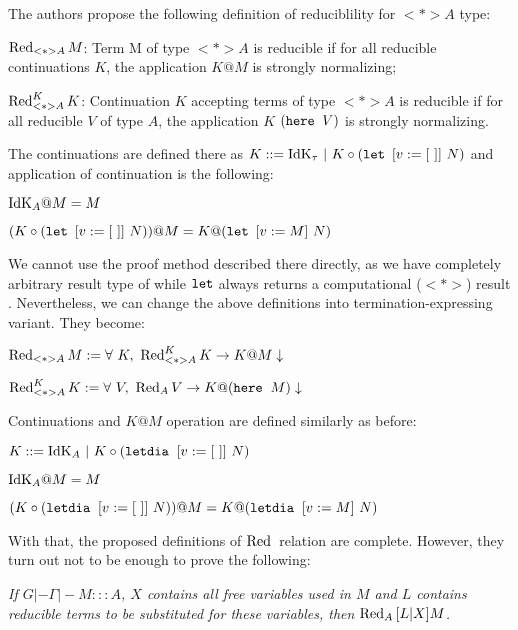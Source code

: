 The authors propose the following definition of reduciblility for $<*>A$ type:
\begin{description}
\item $\Red{M}{<*>A}$: Term M of type $<*>A$ is reducible if for all reducible continuations $K$, the application $K @ M$ is strongly normalizing;
\item $\RedK{K}{<*>A}$: Continuation $K$ accepting terms of type $<*>A$ is reducible if for all reducible $V$ of type $A$, the application $K $ $(\here{V})$ is strongly normalizing.
\end{description}

The continuations are defined there as $ K ::= \IdK{\tau} ~|~ K \circ (\letT{v}{[~]}{N})$ and application of continuation is the following:
\begin{description}
\item $\IdK{A} @ M = M$
\item $ (K \circ (\letT{v}{[~]}{N})) @ M = K @ (\letT{v}{M}{N})$
\end{description}

We cannot use the proof method described there directly, as we have completely arbitrary result type of  while $\letTe{}$ always returns a computational ($<*>$) result . Nevertheless, we can change the above definitions into termination-expressing variant. They become:
\begin{description}
\item $\Red{M}{<*>A} := \forall\ K,\ \RedK{K}{<*>A}-> \termin{K@M}$
\item $\RedK{K}{<*>A}:= \forall\ V,\ \Red{V}{A} -> \termin{K@(\here{M})}$
\end{description}

Continuations and $K@M$ operation are defined similarly as before:
\begin{description}
\item $ K ::= \IdK{A} ~|~ K \circ (\letdia{v}{}{[~]}{N})$
\item $\IdK{A} @ M = M$
\item $ (K \circ (\letdia{v}{}{[~]}{N})) @ M = K @ (\letdia{v}{}{M}{N})$
\end{description}

With that, the proposed definitions of $\Red{}{}$ relation are complete. However, they turn out not to be enough to prove the following:

\begin{introtheorem}\em
If $G |- \Gamma |- M ::: A$, $X$ contains all free variables used in $M$ and $L$ contains reducible terms to be substituted for these variables, then
$\Red{\substt{L}{X}{M}}{A}$.
\end{introtheorem}

